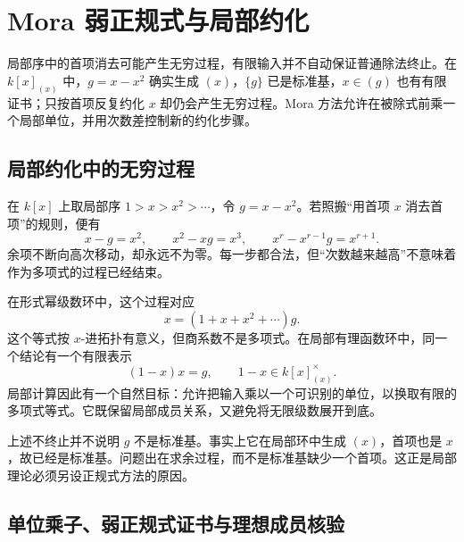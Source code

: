 
\section{Mora 弱正规式与局部约化}
\label{b3:sec:F02}

局部序中的首项消去可能产生无穷过程，有限输入并不自动保证普通除法终止。在 \(k[x]_{(x)}\) 中，\(g=x-x^2\) 确实生成 \((x)\)，\(\{g\}\) 已是标准基，\(x\in(g)\) 也有有限证书；只按首项反复约化 \(x\) 却仍会产生无穷过程。Mora 方法允许在被除式前乘一个局部单位，并用次数差控制新的约化步骤。


\subsection{局部约化中的无穷过程}
\label{b3:subsec:F02:01}

在 \(k[x]\) 上取局部序 \(1>x>x^2>\cdots\)，令 \(g=x-x^2\)。若照搬“用首项 \(x\) 消去首项”的规则，便有
\[
	x-g=x^2,\qquad x^2-xg=x^3,\qquad x^r-x^{r-1}g=x^{r+1}.
\]
余项不断向高次移动，却永远不为零。每一步都合法，但“次数越来越高”不意味着作为多项式的过程已经结束。

\ProseParagraphBreak
在形式幂级数环中，这个过程对应
\[
	x=(1+x+x^2+\cdots)g.
\]
这个等式按 \(x\)-进拓扑有意义，但商系数不是多项式。在局部有理函数环中，同一个结论有一个有限表示
\[
	(1-x)x=g,\qquad 1-x\in k[x]_{(x)}^\times.
\]
局部计算因此有一个自然目标：允许把输入乘以一个可识别的单位，以换取有限的多项式等式。它既保留局部成员关系，又避免将无限级数展开到底。

\begin{remark}
	上述不终止并不说明 \(g\) 不是标准基。事实上它在局部环中生成 \((x)\)，首项也是 \(x\)，故已经是标准基。问题出在求余过程，而不是标准基缺少一个首项。这正是局部理论必须另设正规式方法的原因。
\end{remark}

\subsection{单位乘子、弱正规式证书与理想成员核验}
\label{b3:subsec:F02:02}

